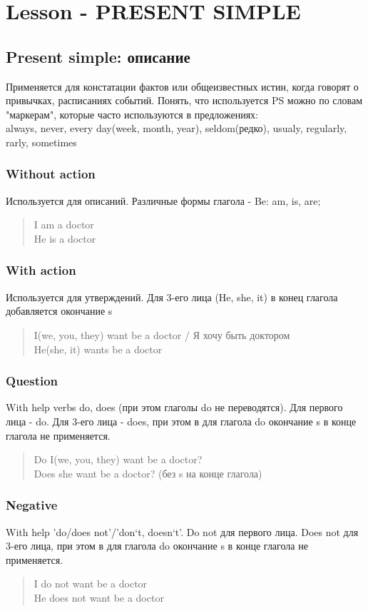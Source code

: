 \section{Lesson - PRESENT SIMPLE}

 \subsection{Present simple: описание}
 Применяется для констатации фактов или общеизвестных истин, когда говорят о привычках, расписаниях событий. Понять, что используется PS  можно по словам "маркерам", которые часто используются в предложениях:\\
 always, never, every day(week, month, year), seldom(редко), usualy, regularly, rarly, sometimes
 

 \subsubsection{Without action}
 Используется для описаний. Различные формы глагола - Be: am, is, are;
	\begin{quote}
		I am a doctor\\
		He is a doctor
	\end{quote}
\subsubsection{With action} 
 Используется для утверждений. Для 3-его лица (He, she, it) в конец глагола добавляется окончание s
 \begin{quote}
 	I(we, you, they) want be a doctor / Я хочу быть доктором\\
 	He(she, it) wants be a doctor	
 \end{quote}
 
 \subsubsection{Question} 
 With  help verbs do, does (при этом глаголы do не переводятся). Для первого лица - do. Для 3-его лица - does, при этом в для глагола do окончание s в конце глагола не применяется.
  \begin{quote}
 Do I(we, you, they) want be a doctor?\\
 Does she want be a doctor? (без s на конце глагола)
 \end{quote}

 \subsubsection{Negative} 
 With help 'do/does not'/'don`t, doesn`t'. Do not для первого лица. Does not  для 3-его лица, при этом в для глагола do окончание s в конце глагола не применяется.
   \begin{quote}
 	I do not want be a doctor\\
 	He does not want be a doctor
 \end{quote}

